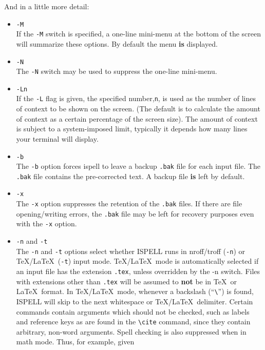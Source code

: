 \documentclass[twoside,11pt]{article}
\begin{document}
And in a little more detail:

\begin{itemize}
\item {\Large\tt -M} \\
If the \verb+-M+ switch is specified, a one-line mini-menu at the bottom of the
screen will summarize these options. By default the menu {\bf is} displayed.

\item {\Large\tt -N} \\
The \verb+-N+ switch may be used to suppress the one-line mini-menu.

\item {\Large\tt -Ln} \\
If the \verb+-L+ flag is given, the specified number,\verb+n+, is used as the
number of lines of context to be shown on the screen.  (The default is to
calculate the amount of context as a certain percentage of the screen
size).  The amount of context is subject to a system-imposed limit, typically
it depends how many lines your terminal will display.

\item {\Large\tt -b} \\
The \verb+-b+ option forces ispell to leave a backup \verb+.bak+ file for each
input file.
The \verb+.bak+ file contains the pre-corrected text.
A backup file {\bf is} left by default.

\item {\Large\tt -x} \\
The \verb+-x+ option suppresses the retention of the \verb+.bak+ files.
If there are file opening/writing errors, the \verb+.bak+ file may be left for
recovery purposes even with the \verb+-x+ option.

\item {\Large\tt -n} and {\Large\tt -t}\\
The \verb+-n+ and \verb+-t+ options select whether ISPELL runs in nroff/troff
(\verb+-n+) or \TeX /\LaTeX\ (\verb+-t+) input mode.
\TeX /\LaTeX\ mode is automatically selected if an input file has the extension
\verb+.tex+, unless overridden by the -n switch.
Files with extensions other than \verb+.tex+ will be assumed to {\bf not} be in
\TeX\ or \LaTeX\ format.
In \TeX /\LaTeX\ mode, whenever a backslash (``\verb+\+'') is found, ISPELL
will skip to the next whitespace or \TeX /\LaTeX\ delimiter.
Certain commands contain arguments which should not be checked, such as labels
and reference keys as are found in the \verb+\cite+ command, since they contain
arbitrary, non-word arguments.
Spell checking is also suppressed when in math mode.
Thus, for example, given


\end{itemize}
\end{document}
